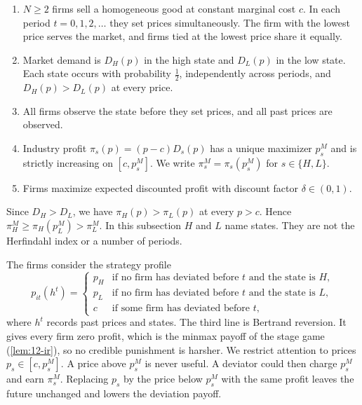 \begin{assumption}\label{asm:12-two-state}
\leavevmode
\begin{enumerate}[label=(\roman*)]
\item $N \ge 2$ firms sell a homogeneous good at constant marginal cost $c$. In each period $t = 0, 1, 2, \dots$ they
set prices simultaneously. The firm with the lowest price serves the market, and firms tied at the lowest price
share it equally.
\item Market demand is $D_H(p)$ in the high state and $D_L(p)$ in the low state. Each state occurs with probability
$\frac{1}{2}$, independently across periods, and $D_H(p) > D_L(p)$ at every price.
\item All firms observe the state before they set prices, and all past prices are observed.
\item Industry profit $\pi_s(p) = (p-c)D_s(p)$ has a unique maximizer $p_s^M$ and is strictly increasing on
$[c, p_s^M]$. We write $\pi_s^M = \pi_s(p_s^M)$ for $s \in \{H, L\}$.
\item Firms maximize expected discounted profit with discount factor $\delta \in (0,1)$.
\end{enumerate}
\end{assumption}

Since $D_H > D_L$, we have $\pi_H(p) > \pi_L(p)$ at every $p > c$. Hence $\pi_H^M \ge \pi_H(p_L^M) > \pi_L^M$. In
this subsection $H$ and $L$ name states. They are not the Herfindahl index or a number of periods.

The firms consider the strategy profile
\begin{equation}\label{eq:12-two-state-strategy}
p_{it}(h^t) =
\begin{cases}
p_H & \text{if no firm has deviated before } t \text{ and the state is } H,\\
p_L & \text{if no firm has deviated before } t \text{ and the state is } L,\\
c & \text{if some firm has deviated before } t,
\end{cases}
\end{equation}
where $h^t$ records past prices and states. The third line is Bertrand reversion. It gives every firm zero profit,
which is the minmax payoff of the stage game (\cref{lem:12-ir}), so no credible punishment is harsher. We
restrict attention to prices $p_s \in [c, p_s^M]$. A price above $p_s^M$ is never useful. A deviator could then
charge $p_s^M$ and earn $\pi_s^M$. Replacing $p_s$ by the price below $p_s^M$ with the same profit leaves the future
unchanged and lowers the deviation payoff.

